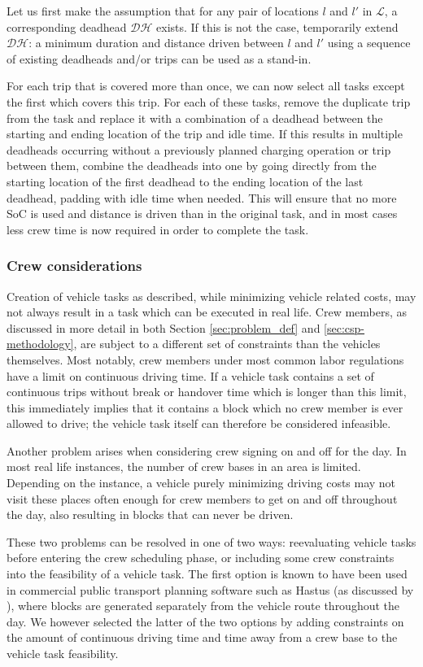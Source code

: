 \documentclass[]{article}
\begin{document}
Let us first make the assumption that for any pair of locations $l$ and $l'$ in $\mathcal{L}$, a corresponding deadhead $\mathcal{DH}$ exists. If this is not the case, temporarily extend $\mathcal{DH}$: a minimum duration and distance driven between $l$ and $l'$ using a sequence of existing deadheads and/or trips can be used as a stand-in. 

For each trip that is covered more than once, we can now select all tasks except the first which covers this trip. For each of these tasks, remove the duplicate trip from the task and replace it with a combination of a deadhead between the starting and ending location of the trip and idle time. If this results in multiple deadheads occurring without a previously planned charging operation or trip between them, combine the deadheads into one by going directly from the starting location of the first deadhead to the ending location of the last deadhead, padding with idle time when needed. This will ensure that no more SoC is used and distance is driven than in the original task, and in most cases less crew time is now required in order to complete the task.  

\subsubsection{Crew considerations}
Creation of vehicle tasks as described, while minimizing vehicle related costs, may not always result in a task which can be executed in real life. Crew members, as discussed in more detail in both Section \ref{sec:problem_def} and \ref{sec:csp-methodology}, are subject to a different set of constraints than the vehicles themselves. Most notably, crew members under most common labor regulations have a limit on continuous driving time. If a vehicle task contains a set of continuous trips without break or handover time which is longer than this limit, this immediately implies that it contains a block which no crew member is ever allowed to drive; the vehicle task itself can therefore be considered infeasible.  

Another problem arises when considering crew signing on and off for the day. In most real life instances, the number of crew bases in an area is limited. Depending on the instance, a vehicle purely minimizing driving costs may not visit these places often enough for crew members to get on and off throughout the day, also resulting in blocks that can never be driven.   

These two problems can be resolved in one of two ways: reevaluating vehicle tasks before entering the crew scheduling phase, or including some crew constraints into the feasibility of a vehicle task. The first option is known to have been used in commercial public transport planning software such as Hastus (as discussed by \citet{Hastus90}), where blocks are generated separately from the vehicle route throughout the day. We however selected the latter of the two options by adding constraints on the amount of continuous driving time and time away from a crew base to the vehicle task feasibility.
\end{document}
